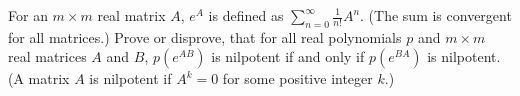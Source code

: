 \documentclass{article}
\begin{document}
\setlength{\parindent}{0pt}
For an $m\times m$ real matrix $A$, $e^{A}$ is defined as $\sum_{n=0}^{\infty}\frac{1}{n!}A^{n}$. (The sum is convergent for all matrices.) Prove or disprove, that for all real polynomials $p$ and $m\times m$ real matrices $A$ and $B$, $p\left(e^{AB}\right)$ is nilpotent if and only if $p\left(e^{BA}\right)$ is nilpotent. (A matrix $A$ is nilpotent if $A^{k}=0$ for some positive integer $k$.)
\end{document}
